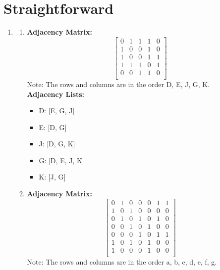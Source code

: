 \documentclass[a4paper]{article}
\begin{document}
\section{Straightforward}
    \begin{enumerate}

    \item \begin{enumerate}
        \item \textbf{Adjacency Matrix:}
            \[
            \begin{bmatrix}
                0 & 1 & 1 & 1 & 0 \\
                1 & 0 & 0 & 1 & 0 \\
                1 & 0 & 0 & 1 & 1 \\
                1 & 1 & 1 & 0 & 1 \\
                0 & 0 & 1 & 1 & 0 \\
            \end{bmatrix}
            \]
            Note: The rows and columns are in the order D, E, J, G, K. \\

            \textbf{Adjacency Lists:}
            \begin{itemize}
                \item D: [E, G, J]
                \item E: [D, G]
                \item J: [D, G, K]
                \item G: [D, E, J, K]
                \item K: [J, G]
            \end{itemize}

        \item \textbf{Adjacency Matrix:}
        \[
            \begin{bmatrix}
                0 & 1 & 0 & 0 & 0 & 1 & 1 \\
                1 & 0 & 1 & 0 & 0 & 0 & 0 \\
                0 & 1 & 0 & 1 & 0 & 1 & 0 \\
                0 & 0 & 1 & 0 & 1 & 0 & 0 \\
                0 & 0 & 0 & 1 & 0 & 1 & 1 \\
                1 & 0 & 1 & 0 & 1 & 0 & 0 \\
                1 & 0 & 0 & 0 & 1 & 0 & 0 \\
            \end{bmatrix}
        \]
        Note: The rows and columns are in the order a, b, c, d, e, f, g. \\


\end{enumerate}
\end{enumerate}
\end{document}
